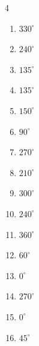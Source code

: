 \begin{multicols}{4}
\begin{enumerate}
  \item $\displaystyle 330^{\circ}$

  \item $\displaystyle 240^{\circ}$

  \item $\displaystyle 135^{\circ}$

  \item $\displaystyle 135^{\circ}$

  \item $\displaystyle 150^{\circ}$

  \item $\displaystyle 90^{\circ}$

  \item $\displaystyle 270^{\circ}$

  \item $\displaystyle 210^{\circ}$

  \item $\displaystyle 300^{\circ}$

  \item $\displaystyle 240^{\circ}$

  \item $\displaystyle 360^{\circ}$
        \phantom{$\displaystyle =2\pi$}

  \item $\displaystyle 60^{\circ}$

  \item $\displaystyle 0^{\circ}$
        \phantom{$\displaystyle =0$}

  \item $\displaystyle 270^{\circ}$

  \item $\displaystyle 0^{\circ}$
        \phantom{$\displaystyle =0$}

\columnbreak %

\resetques

  \item $\displaystyle 45^{\circ}$


\end{enumerate}
\end{multicols}
